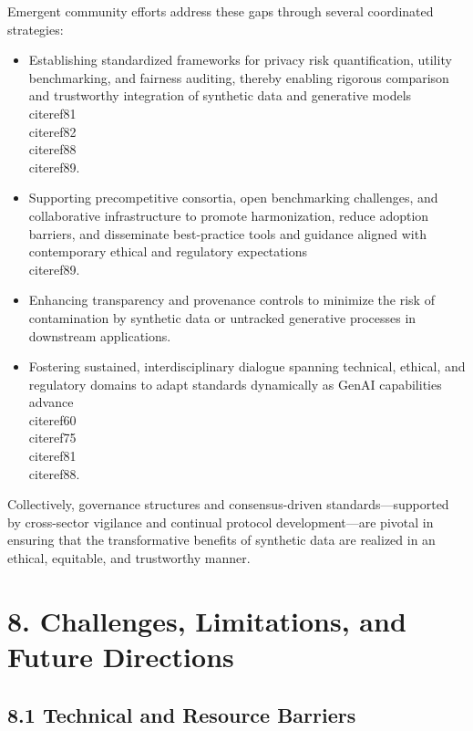 \documentclass[11pt]{article}
\begin{document}
Emergent community efforts address these gaps through several coordinated strategies:

\begin{itemize}
    \item Establishing standardized frameworks for privacy risk quantification, utility benchmarking, and fairness auditing, thereby enabling rigorous comparison and trustworthy integration of synthetic data and generative models \\cite{ref81}\\cite{ref82}\\cite{ref88}\\cite{ref89}.
    \item Supporting precompetitive consortia, open benchmarking challenges, and collaborative infrastructure to promote harmonization, reduce adoption barriers, and disseminate best-practice tools and guidance aligned with contemporary ethical and regulatory expectations \\cite{ref89}.
    \item Enhancing transparency and provenance controls to minimize the risk of contamination by synthetic data or untracked generative processes in downstream applications.
    \item Fostering sustained, interdisciplinary dialogue spanning technical, ethical, and regulatory domains to adapt standards dynamically as GenAI capabilities advance \\cite{ref60}\\cite{ref75}\\cite{ref81}\\cite{ref88}.
\end{itemize}

Collectively, governance structures and consensus-driven standards—supported by cross-sector vigilance and continual protocol development—are pivotal in ensuring that the transformative benefits of synthetic data are realized in an ethical, equitable, and trustworthy manner.

\section{8. Challenges, Limitations, and Future Directions}

\subsection{8.1 Technical and Resource Barriers}
\end{document}
